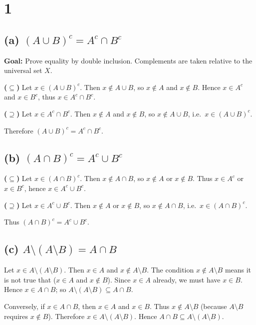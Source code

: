\documentclass[12pt,a4paper]{article}
\theoremstyle{definition}
\theoremstyle{remark}
\begin{document}
\section*{1}

\subsection*{(a) $(A\cup B)^c = A^c \cap B^c$}

\textbf{Goal:} Prove equality by double inclusion. Complements are taken relative to the universal set $X$.

\textbf{($\subseteq$)} Let $x \in (A\cup B)^c$. Then $x \notin A\cup B$, so $x\notin A$ and $x\notin B$. Hence $x\in A^c$ and $x\in B^c$, thus $x\in A^c\cap B^c$.

\textbf{($\supseteq$)} Let $x \in A^c\cap B^c$. Then $x\notin A$ and $x\notin B$, so $x\notin A\cup B$, i.e.\ $x\in (A\cup B)^c$.

Therefore $(A\cup B)^c = A^c\cap B^c$.

\subsection*{(b) $(A\cap B)^c = A^c \cup B^c$}

\textbf{($\subseteq$)} Let $x\in (A\cap B)^c$. Then $x \notin A\cap B$, so $x\notin A$ or $x\notin B$. Thus $x\in A^c$ or $x\in B^c$, hence $x\in A^c \cup B^c$.

\textbf{($\supseteq$)} Let $x\in A^c \cup B^c$. Then $x\notin A$ or $x\notin B$, so $x\notin A\cap B$, i.e.\ $x\in (A\cap B)^c$.

Thus $(A\cap B)^c = A^c \cup B^c$.

\subsection*{(c) $A \setminus (A \setminus B) = A \cap B$}

Let $x \in A \setminus (A \setminus B)$. Then $x\in A$ and $x \notin A\setminus B$. The condition $x\notin A\setminus B$ means it is not true that ($x\in A$ and $x\notin B$). Since $x\in A$ already, we must have $x\in B$. Hence $x\in A\cap B$; so $A \setminus (A \setminus B) \subseteq A\cap B$.

Conversely, if $x\in A\cap B$, then $x\in A$ and $x\in B$. Thus $x\notin A\setminus B$ (because $A\setminus B$ requires $x\notin B$). Therefore $x\in A\setminus (A\setminus B)$. Hence $A\cap B \subseteq A\setminus (A\setminus B)$.
\end{document}

